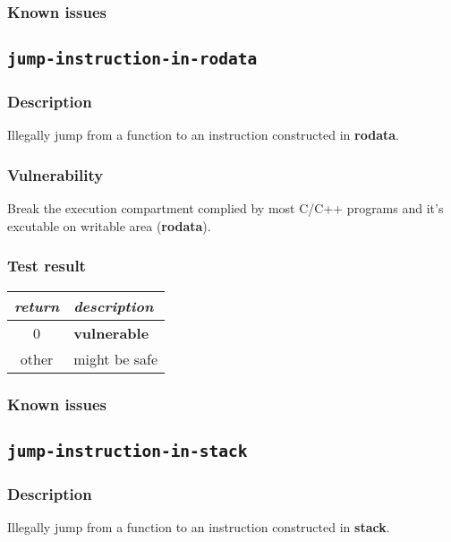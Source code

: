 \documentclass[a4paper]{book}
\begin{document}
\subsubsection{Known issues}


\newpage
\subsection{\texttt{jump-instruction-in-rodata}}\label{test-jump-instruction-in-rodata}

\subsubsection{Description}
Illegally jump from a function to an instruction constructed in \textbf{rodata}.

\subsubsection{Vulnerability}
Break the execution compartment complied by most C/C++ programs and it’s excutable on writable area (\textbf{rodata}).

\subsubsection{Test result}
\begin{tabular}{cl}
  \toprule
  \emph{return}  & \emph{description} \\
  \midrule
  0              & \textbf{vulnerable} \\
  other          & might be safe \\
  \bottomrule
\end{tabular}
  
\subsubsection{Known issues}

\newpage
\subsection{\texttt{jump-instruction-in-stack}}\label{test-jump-instruction-in-stack}

\subsubsection{Description}
Illegally jump from a function to an instruction constructed in \textbf{stack}.
\end{document}
